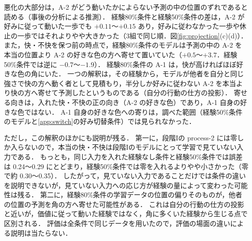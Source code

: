 悪化の大部分は，A-2 がどう動いたかによらない予測の中の位置のずれであると読める（事後の分析による推測）．
経験80\%条件と経験50\%条件の差は，A-2 が好みに従って動いた一歩でも $+0.11$〜$+0.15$ あり，好みに従わなかった一歩や休止の一歩ではそれよりやや大きかった（3組で同じ順．図\ref{fig:projection}(c)(d)）．
また，快・不快を保つ前の時点で，経験80\%条件のモデルは予測の中の A-2 を本当の位置より A-2 の好きな色の方へ寄せて置いていた（$+0.5$〜$+3.7$．経験50\%条件では逆に $-0.7$〜$-1.9$）．
経験80\%条件の A-1 は，快が高ければほぼ好きな色の角にいた．
一つの解釈は，その経験から，モデルが他者を自分と同じ強さで快の方へ動く者として見積もり，半分しか好みに従わない A-2 を本当より快の方へ寄せて予測したというものである（自分の行動の仕方の投影）．
寄せる向きは，入れた快・不快の正の向き（A-2 の好きな色）であり，A-1 自身の好きな色ではない．
A-1 自身の好きな色への寄りは，調べた範囲（経験50\%条件のモデルと\ref{app:switch}の好み切替条件）では見られなかった．

ただし，この解釈のほかにも説明が残る．
第一に，段階Iの process-2 には零しか入らないので，本当の快・不快は段階Iのモデルにとって学習で見ていない入力である．
もっとも，同じ入力を入れた経験なし条件と経験50\%条件では誤差は 0.24〜0.29 にとどまり，経験50\%条件では零を入れるよりやや小さかった（零で約 0.30〜0.35）．
したがって，見ていない入力であることだけでは条件の違いを説明できないが，見ていない入力への応じ方が経験の量によって変わった可能性は残る．
第二に，経験80\%条件の学習データの位置の偏りそのものが，他者の位置の予測を角の方へ寄せた可能性がある．
これは自分の行動の仕方の投影と近いが，価値に従って動いた経験ではなく，角に多くいた経験から生じる点で区別される．
評価は全条件で同じデータを用いたので，評価の場面の違いによる説明は当たらない．

